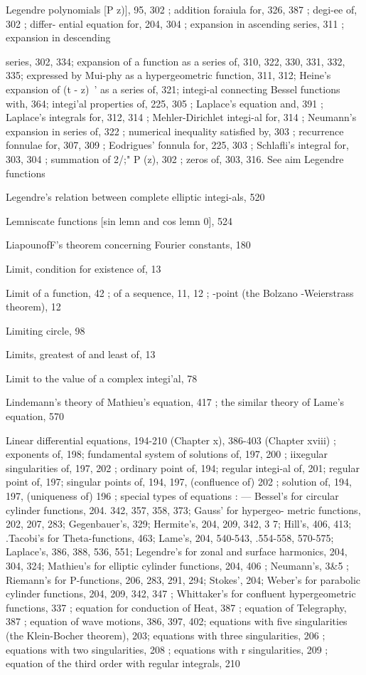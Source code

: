Legendre polynomials [P   z)], 95, 302 ; addition foraiula for, 326, 387 ; degi-ee of, 302 ; differ-
ential equation for, 204, 304 ; expansion in ascending series, 311 ; expansion in descending

%
%

series, 302, 334; expansion of a function as a series of, 310, 322, 330, 331, 332, 335;
expressed by Mui-phy as a hypergeometric function, 311, 312; Heine's expansion of (t - z)~'
as a series of, 321; integi-al connecting Bessel functions with, 364; integi'al properties of,
225, 305 ; Laplace's equation and, 391 ; Laplace's integrals for, 312, 314 ; Mehler-Dirichlet
integi-al for, 314 ; Neumann's expansion in series of, 322 ; numerical inequality satisfied by,
303 ; recurrence fonnulae for, 307, 309 ; Eodrigues' fonnula for, 225, 303 ; Schlafli's integral
for, 303, 304 ; summation of 2/;" P  (z), 302 ; zeros of, 303, 316. See aim Legendre functions

Legendre's relation between complete elliptic integi-als, 520

Lemniscate functions [sin lemn and cos lemn 0], 524

LiapounofF's theorem concerning Fourier constants, 180

Limit, condition for existence of, 13

Limit of a function, 42 ; of a sequence, 11, 12 ; -point (the Bolzano -Weierstrass theorem), 12

Limiting circle, 98

Limits, greatest of and least of, 13

Limit to the value of a complex integi'al, 78

Lindemann's theory of Mathieu's equation, 417 ; the similar theory of Lame's equation, 570

Linear differential equations, 194-210 (Chapter x), 386-403 (Chapter xviii) ; exponents of, 198;
fundamental system of solutions of, 197, 200 ; iixegular singularities of, 197, 202 ; ordinary
point of, 194; regular integi-al of, 201; regular point of, 197; singular points of, 194, 197,
(confluence of) 202 ; solution of, 194, 197, (uniqueness of) 196 ; special types of equations :
— Bessel's for circular cylinder functions, 204. 342, 357, 358, 373; Gauss' for hypergeo-
metric functions, 202, 207, 283; Gegenbauer's, 329; Hermite's, 204, 209, 342, 3 7; Hill's,
406, 413; .Tacobi's for Theta-functions, 463; Lame's, 204, 540-543, .554-558, 570-575;
Laplace's, 386, 388, 536, 551; Legendre's for zonal and surface harmonics, 204, 304, 324;
Mathieu's for elliptic cylinder functions, 204, 406 ; Neumann's, 3\&5 ; Riemann's for
P-functions, 206, 283, 291, 294; Stokes', 204; Weber's for parabolic cylinder functions,
204, 209, 342, 347 ; Whittaker's for confluent hypergeometric functions, 337 ; equation for
conduction of Heat, 387 ; equation of Telegraphy, 387 ; equation of wave motions, 386, 397,
402; equations with five singularities (the Klein-Bocher theorem), 203; equations with three
singularities, 206 ; equations with two singularities, 208 ; equations with r singularities,
209 ; equation of the third order with regular integrals, 210

